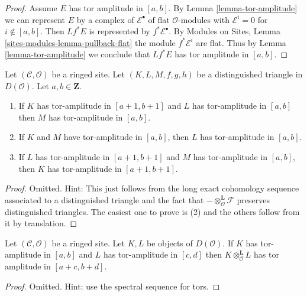 \begin{proof}
Assume $E$ has tor amplitude in $[a, b]$. By
Lemma \ref{lemma-tor-amplitude}
we can represent $E$ by a complex of
$\mathcal{E}^\bullet$ of flat $\mathcal{O}$-modules with
$\mathcal{E}^i = 0$ for $i \not \in [a, b]$. Then
$Lf^*E$ is represented by $f^*\mathcal{E}^\bullet$.
By Modules on Sites, Lemma \ref{sites-modules-lemma-pullback-flat}
the module $f^*\mathcal{E}^i$ are flat.
Thus by Lemma \ref{lemma-tor-amplitude}
we conclude that $Lf^*E$ has tor amplitude in $[a, b]$.
\end{proof}

\begin{lemma}
\label{lemma-cone-tor-amplitude}
Let $(\mathcal{C}, \mathcal{O})$ be a ringed site.
Let $(K, L, M, f, g, h)$ be a distinguished
triangle in $D(\mathcal{O})$. Let $a, b \in \mathbf{Z}$.
\begin{enumerate}
\item If $K$ has tor-amplitude in $[a + 1, b + 1]$ and
$L$ has tor-amplitude in $[a, b]$ then $M$ has
tor-amplitude in $[a, b]$.
\item If $K$ and $M$ have tor-amplitude in $[a, b]$, then
$L$ has tor-amplitude in $[a, b]$.
\item If $L$ has tor-amplitude in $[a + 1, b + 1]$
and $M$ has tor-amplitude in $[a, b]$, then
$K$ has tor-amplitude in $[a + 1, b + 1]$.
\end{enumerate}
\end{lemma}

\begin{proof}
Omitted. Hint: This just follows from the long exact cohomology sequence
associated to a distinguished triangle and the fact that
$- \otimes_\mathcal{O}^{\mathbf{L}} \mathcal{F}$
preserves distinguished triangles.
The easiest one to prove is (2) and the others follow from it by
translation.
\end{proof}

\begin{lemma}
\label{lemma-tensor-tor-amplitude}
Let $(\mathcal{C}, \mathcal{O})$ be a ringed site. Let $K, L$ be objects of
$D(\mathcal{O})$. If $K$ has tor-amplitude in $[a, b]$ and
$L$ has tor-amplitude in $[c, d]$ then $K \otimes_\mathcal{O}^\mathbf{L} L$
has tor amplitude in $[a + c, b + d]$.
\end{lemma}

\begin{proof}
Omitted. Hint: use the spectral sequence for tors.
\end{proof}

